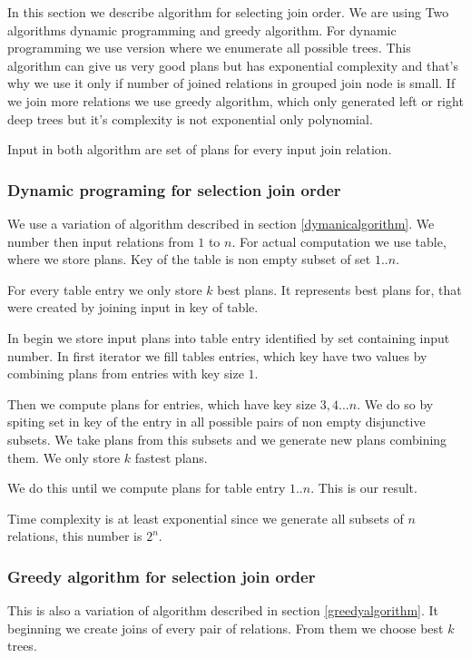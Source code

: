 In this section we describe algorithm for selecting join order. We are using Two algorithms dynamic programming and greedy algorithm. For dynamic programming we use version where we enumerate all possible trees. This algorithm can give us very good plans but has exponential complexity and that's why we use it only if number of joined relations in grouped join node is small. If we join more relations we use greedy algorithm, which only generated left or right deep trees but it's complexity is not exponential only polynomial.

Input in both algorithm are set of plans for every input join relation.

\subsubsection{Dynamic programing for selection join order}

We use a variation of algorithm described in section \ref{dymanicalgorithm}. We number then input relations from $1$ to $n$. For actual computation we use table, where we store plans. Key of the table is non empty subset of set $1..n$.

For every table entry we only store $k$ best plans. It represents best plans for, that were created by joining input in key of table.

In begin we store input plans into table entry identified by set containing input number. In first iterator we fill tables entries, which key have two values by combining plans from entries with key size $1$.

Then we compute plans for entries, which have key size $3,4...n$. We do so by spiting set in key of the entry in all possible pairs of non empty disjunctive subsets. We take plans from this subsets and we generate new plans combining them. We only store $k$ fastest plans.

We do this until we compute plans for table entry ${1..n}$. This is our result.

Time complexity is at least exponential since we generate all subsets of $n$ relations, this number is $2^n$.


\subsubsection{Greedy algorithm for selection join order}
 This is also a variation of algorithm described in section \ref{greedyalgorithm}. It beginning we create joins of every pair of relations. From them we choose best $k$ trees.
 
